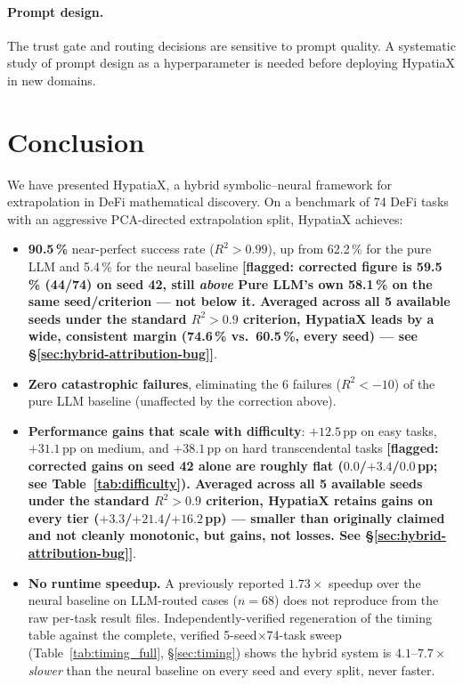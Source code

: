 \documentclass[twoside,11pt]{article}
\newcommand{\Rsq}{R^{2}}
\begin{document}
\paragraph{Prompt design.}
The trust gate and routing decisions are sensitive to prompt quality.  A systematic
study of prompt design as a hyperparameter is needed before deploying HypatiaX
in new domains.

\section{Conclusion}
\label{sec:conclusion}

We have presented HypatiaX, a hybrid symbolic--neural framework for extrapolation
in DeFi mathematical discovery.  On a benchmark of 74 DeFi tasks with an aggressive
PCA-directed extrapolation split, HypatiaX achieves:

\begin{itemize}
  \item \textbf{90.5\,\%} near-perfect success rate ($\Rsq > 0.99$), up from
    62.2\,\% for the pure LLM and 5.4\,\% for the neural baseline
    \textbf{[flagged: corrected figure is 59.5\,\% (44/74) on seed 42,
    still \emph{above} Pure LLM's own 58.1\,\% on the same seed/criterion
    --- not below it. Averaged across all 5 available seeds under the
    standard $\Rsq>0.9$ criterion, HypatiaX leads by a wide, consistent
    margin (74.6\,\% vs.\ 60.5\,\%, every seed) --- see
    \S\ref{sec:hybrid-attribution-bug}]}.
  \item \textbf{Zero catastrophic failures}, eliminating the 6 failures ($\Rsq < -10$)
    of the pure LLM baseline (unaffected by the correction above).
  \item \textbf{Performance gains that scale with difficulty}: $+12.5$\,pp on easy tasks,
    $+31.1$\,pp on medium, and $+38.1$\,pp on hard transcendental tasks
    \textbf{[flagged: corrected gains on seed 42 alone are roughly flat
    ($0.0$/$+3.4$/$0.0$\,pp; see Table~\ref{tab:difficulty}). Averaged
    across all 5 available seeds under the standard $\Rsq>0.9$ criterion,
    HypatiaX retains gains on every tier ($+3.3$/$+21.4$/$+16.2$\,pp) ---
    smaller than originally claimed and not cleanly monotonic, but gains,
    not losses. See \S\ref{sec:hybrid-attribution-bug}]}.
  \item \textbf{No runtime speedup.} A previously reported $1.73\times$ speedup
    over the neural baseline on LLM-routed cases ($n=68$) does not reproduce
    from the raw per-task result files. Independently-verified regeneration
    of the timing table against the complete, verified 5-seed$\times$74-task
    sweep (Table~\ref{tab:timing_full}, \S\ref{sec:timing}) shows the hybrid
    system is $4.1$--$7.7\times$ \emph{slower} than the neural baseline on
    every seed and every split, never faster.
\end{itemize}
\end{document}
